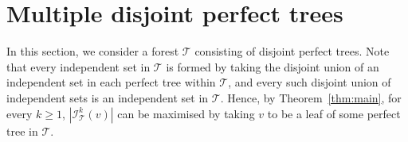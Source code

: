 \documentclass[11pt]{article}
\theoremstyle{definition}
\newcommand{\cI}{\mathcal{I}}
\begin{document}

\section{Multiple disjoint perfect trees}

In this section, we consider a forest $\mathcal{T}$ consisting of disjoint perfect trees. Note that every independent set in $\mathcal{T}$ is formed by taking the disjoint union of an independent set in each perfect tree within $\mathcal{T}$, and every such disjoint union of independent sets is an independent set in $\mathcal{T}$. Hence, by Theorem~\ref{thm:main}, for every $k\geq 1$, $|\cI_{\mathcal{T}}^k(v)|$ can be maximised by taking $v$ to be a leaf of some perfect tree in $\mathcal{T}$.  %
\end{document}
